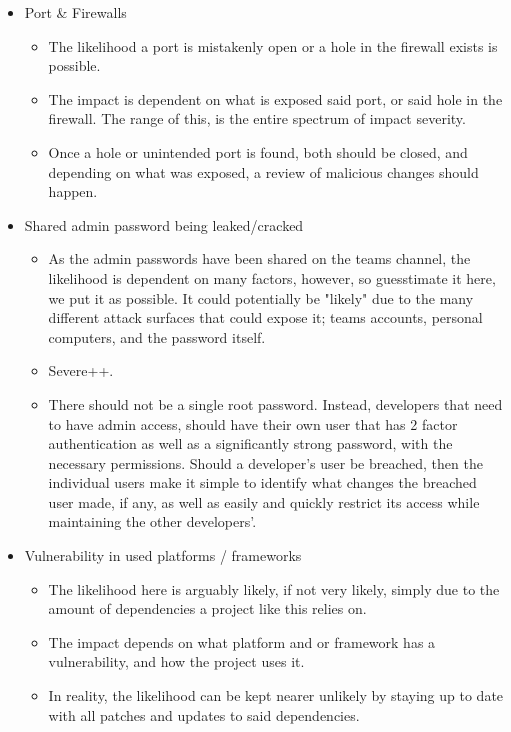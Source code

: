 \documentclass{article}
\begin{document}
\begin{itemize}
\begin{itemize}
    \end{itemize}
    \item Port \& Firewalls
    \begin{itemize}
        \item The likelihood a port is mistakenly open or a hole in the firewall exists is possible.
        \item The impact is dependent on what is exposed said port, or said hole in the firewall. The range of this, is the entire spectrum of impact severity.
        \item Once a hole or unintended port is found, both should be closed, and depending on what was exposed, a review of malicious changes should happen.
    \end{itemize}
    \item Shared admin password being leaked/cracked
    \begin{itemize}
        \item As the admin passwords have been shared on the teams channel, the likelihood is dependent on many factors, however, so guesstimate it here, we put it as possible. It could potentially be "likely" due to the many different attack surfaces that could expose it; teams accounts, personal computers, and the password itself.
        \item Severe++.
        \item There should not be a single root password. Instead, developers that need to have admin access, should have their own user that has 2 factor authentication as well as a significantly strong password, with the necessary permissions. Should a developer's user be breached, then the individual users make it simple to identify what changes the breached user made, if any, as well as easily and quickly restrict its access while maintaining the other developers'.
    \end{itemize}
    \item Vulnerability in used platforms / frameworks
    \begin{itemize}
        \item The likelihood here is arguably likely, if not very likely, simply due to the amount of dependencies a project like this relies on.
        \item The impact depends on what platform and or framework has a vulnerability, and how the project uses it.
        \item In reality, the likelihood can be kept nearer unlikely by staying up to date with all patches and updates to said dependencies.

\end{itemize}
\end{itemize}
\end{document}
